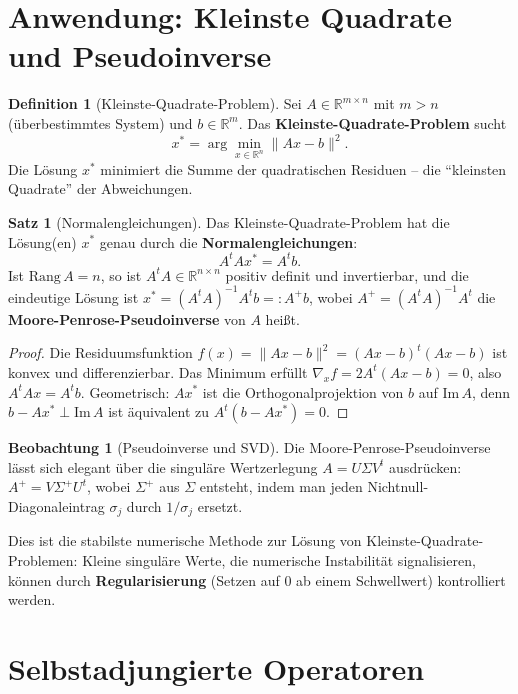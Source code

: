 ﻿\documentclass[a4paper,12pt]{report}
\theoremstyle{definition}
\newtheorem{definition}{Definition}
\newtheorem{satz}{Satz}
\newtheorem{beobachtung}{Beobachtung}
\begin{document}
\section{Anwendung: Kleinste Quadrate und Pseudoinverse}

\begin{definition}[Kleinste-Quadrate-Problem]
    Sei $A \in \mathbb{R}^{m \times n}$ mit $m > n$ (überbestimmtes System)
    und $b \in \mathbb{R}^m$. Das \textbf{Kleinste-Quadrate-Problem} sucht
    \[
        x^* = \arg\min_{x \in \mathbb{R}^n} \|Ax - b\|^2.
    \]
    Die Lösung $x^*$ minimiert die Summe der quadratischen Residuen --
    die ``kleinsten Quadrate'' der Abweichungen.
\end{definition}

\begin{satz}[Normalengleichungen]
    Das Kleinste-Quadrate-Problem hat die Lösung(en) $x^*$ genau durch
    die \textbf{Normalengleichungen}:
    \[
        A^t A x^* = A^t b.
    \]
    Ist $\mathrm{Rang}\,A = n$, so ist $A^t A \in \mathbb{R}^{n \times n}$
    positiv definit und invertierbar, und die eindeutige Lösung ist
    $x^* = (A^t A)^{-1} A^t b =: A^+ b$, wobei $A^+ = (A^t A)^{-1} A^t$
    die \textbf{Moore-Penrose-Pseudoinverse} von $A$ heißt.
\end{satz}
\begin{proof}
    Die Residuumsfunktion $f(x) = \|Ax - b\|^2 = (Ax-b)^t(Ax-b)$
    ist konvex und differenzierbar. Das Minimum erfüllt
    $\nabla_x f = 2A^t(Ax - b) = 0$, also $A^t A x = A^t b$.
    Geometrisch: $Ax^*$ ist die Orthogonalprojektion von $b$ auf
    $\mathrm{Im}\,A$, denn $b - Ax^* \perp \mathrm{Im}\,A$
    ist äquivalent zu $A^t(b - Ax^*) = 0$.
\end{proof}

\begin{beobachtung}[Pseudoinverse und SVD]
    Die Moore-Penrose-Pseudoinverse lässt sich elegant über die
    singuläre Wertzerlegung $A = U\Sigma V^t$ ausdrücken:
    $A^+ = V \Sigma^+ U^t$, wobei $\Sigma^+$ aus $\Sigma$ entsteht,
    indem man jeden Nichtnull-Diagonaleintrag $\sigma_j$ durch
    $1/\sigma_j$ ersetzt.

    Dies ist die stabilste numerische Methode zur Lösung von
    Kleinste-Quadrate-Problemen: Kleine singuläre Werte, die
    numerische Instabilität signalisieren, können durch
    \textbf{Regularisierung} (Setzen auf $0$ ab einem Schwellwert)
    kontrolliert werden.
\end{beobachtung}
\section{Selbstadjungierte Operatoren}
\end{document}
